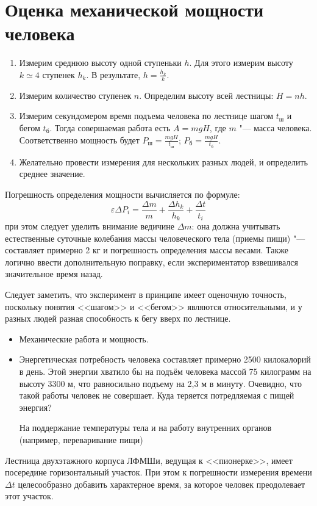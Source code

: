 \section{Оценка механической мощности человека}
\SolveVariant
\begin{enumerate}
    \item Измерим среднюю высоту одной ступеньки \(h\). Для этого измерим высоту \(k \simeq 4\) ступенек \(h_k\). В результате, \(h=\frac{h_k}{k}\).
    \item Измерим количество ступенек \(n\). Определим высоту всей лестницы: \(H=nh\).
    \item Измерим секундомером время подъема человека по лестнице шагом \(t_\text{ш}\) и бегом \(t_\text{б}\). Тогда совершаемая работа есть \(A=mgH\), где \(m\) "--- масса человека. Соответственно мощность будет \(P_\text{ш} = \frac{mgH}{t_\text{ш}}\); \(P_\text{б} = \frac{mgH}{t_\text{б}}\).
    \item Желательно провести измерения для нескольких разных людей, и определить среднее значение.
\end{enumerate}
\MesErrors
Погрешность определения мощности вычисляется по формуле:
\begin{equation}
    \varepsilon \Delta P_i = \frac{\Delta m}{m} + \frac{\Delta h_k}{h_k} + \frac{\Delta t}{t_i}
\end{equation}
при этом следует уделить внимание ведичине \(\Delta m\): она должна учитывать естественные суточные колебания массы человеческого тела (приемы пищи) "--- составляет примерно 2 кг и погрешность определения массы весами. Также логично ввести дополнительную поправку, если экспериментатор взвешивался значительное время назад.\par
Следует заметить, что эксперимент в принципе имеет оценочную точность, поскольку понятия <<шагом>> и <<бегом>> являются относительными, и у разных людей разная способность к бегу вверх по лестнице.
\SchoolBase
\begin{itemize}
    \item Механические работа и мощность.
\end{itemize}
\AdditionalQuestions
\begin{itemize}
    \item Энергетическая потребность человека составляет примерно 2500 килокалорий в день. Этой энергии хватило бы на подъём человека массой 75 килограмм на высоту 3300 м, что равносильно подъему на 2,3 м в минуту. Очевидно, что такой работы человек не совершает. Куда теряется потредляемая с пищей энергия?\par
    \Answer На поддержание температуры тела и на работу внутренних органов (например, переваривание пищи)
\end{itemize}
\AdditionalNotes
Лестница двухэтажного корпуса ЛФМШи, ведущая к <<пионерке>>, имеет посередине горизонтальный участок. При этом к погрешности измерения времени \(\Delta t\) целесообразно добавить характерное время, за которое человек преодолевает этот участок.
